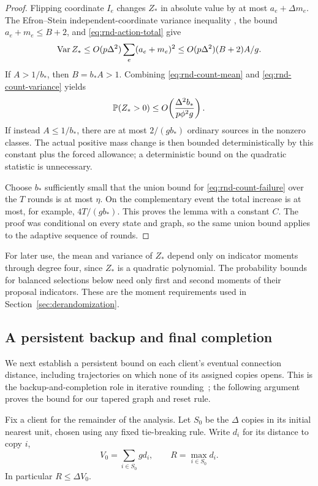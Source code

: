 \begin{proof}
Flipping coordinate $I_e$ changes $Z_*$ in absolute value by at most
$a_e+\Delta m_e$.  The Efron--Stein independent-coordinate variance inequality
\cite[Section~2.2, Proposition~1]{BBLM2005}, the bound
$a_e+m_e\le B+2$, and \eqref{eq:rnd-action-total} give
\begin{equation}\label{eq:rnd-count-variance}
 \operatorname{Var} Z_*
 \le O(p\Delta^2)\sum_e(a_e+m_e)^2
 \le O(p\Delta^2)(B+2)A/g.
\end{equation}
If $A>1/b_*$, then $B=b_*A>1$.  Combining
\eqref{eq:rnd-count-mean} and \eqref{eq:rnd-count-variance} yields
\begin{equation}\label{eq:rnd-count-failure}
 \mathbb P(Z_*>0)
 \le O\!\left(\frac{\Delta^2b_*}{p\phi^2g}\right).
\end{equation}
If instead $A\le1/b_*$, there are at most $2/(gb_*)$ ordinary
sources in the nonzero classes.  The actual positive mass change is
then bounded deterministically by this constant plus the forced
allowance; a deterministic bound on the quadratic statistic is
unnecessary.

Choose $b_*$ sufficiently small that the union bound for
\eqref{eq:rnd-count-failure} over the $T$ rounds is at most $\eta$.
On the complementary event the total increase is at most, for example,
$4T/(gb_*)$.  This proves the lemma with a constant $C$.
The proof was conditional on every state and graph, so the same union
bound applies to the adaptive sequence of rounds.
\end{proof}

For later use, the mean and variance of $Z_*$ depend only on indicator
moments through degree four, since $Z_*$ is a quadratic polynomial.
The probability bounds for balanced selections below need only
first and second moments of their proposal indicators.  These are
the moment requirements used in Section~\ref{sec:derandomization}.

\subsection{A persistent backup and final completion}

We next establish a persistent bound on each client's eventual
connection distance, including trajectories on which none of its assigned
copies opens. This is the backup-and-completion role in iterative
rounding~\cite[Section~3.3 and Lemmas~6.3 and~6.5]{ByrkaEtAl2026};
the following argument proves the bound for our tapered graph and reset
rule.

Fix a client for the remainder of the analysis.  Let $S_0$ be the
$\Delta$ copies in its initial nearest unit, chosen using any fixed
tie-breaking rule.  Write $d_i$ for its distance to copy $i$,
\[
 V_0=\sum_{i\in S_0}gd_i,
 \qquad R=\max_{i\in S_0}d_i.
\]
In particular $R\le\Delta V_0$.

